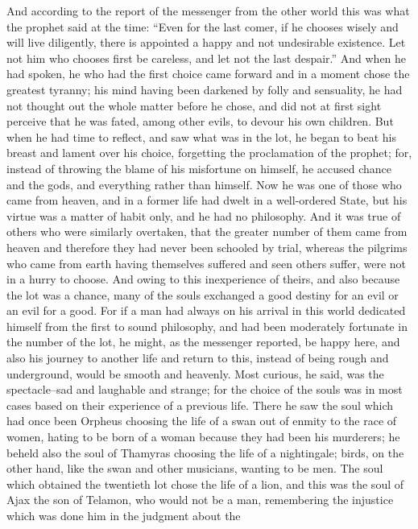 And according to the report of the messenger from the other world this
was what the prophet said at the time: ``Even for the last comer, if he
chooses wisely and will live diligently, there is appointed a happy and
not undesirable existence. Let not him who chooses first be careless,
and let not the last despair.'' And when he had spoken, he who had the
first choice came forward and in a moment chose the greatest tyranny;
his mind having been darkened by folly and sensuality, he had not
thought out the whole matter before he chose, and did not at first
sight perceive that he was fated, among other evils, to devour his own
children. But when he had time to reflect, and saw what was in the lot,
he began to beat his breast and lament over his choice, forgetting the
proclamation of the prophet; for, instead of throwing the blame of his
misfortune on himself, he accused chance and the gods, and everything
rather than himself. Now he was one of those who came from heaven, and
in a former life had dwelt in a well-ordered State, but his virtue was
a matter of habit only, and he had no philosophy. And it was true of
others who were similarly overtaken, that the greater number of them
came from heaven and therefore they had never been schooled by trial,
whereas the pilgrims who came from earth having themselves suffered and
seen others suffer, were not in a hurry to choose. And owing to this
inexperience of theirs, and also because the lot was a chance, many of
the souls exchanged a good destiny for an evil or an evil for a good.
For if a man had always on his arrival in this world dedicated himself
from the first to sound philosophy, and had been moderately fortunate
in the number of the lot, he might, as the messenger reported, be happy
here, and also his journey to another life and return to this, instead
of being rough and underground, would be smooth and heavenly. Most
curious, he said, was the spectacle--sad and laughable and strange; for
the choice of the souls was in most cases based on their experience of
a previous life. There he saw the soul which had once been Orpheus
choosing the life of a swan out of enmity to the race of women, hating
to be born of a woman because they had been his murderers; he beheld
also the soul of Thamyras choosing the life of a nightingale; birds, on
the other hand, like the swan and other musicians, wanting to be men.
The soul which obtained the twentieth lot chose the life of a lion, and
this was the soul of Ajax the son of Telamon, who would not be a man,
remembering the injustice which was done him in the judgment about the
